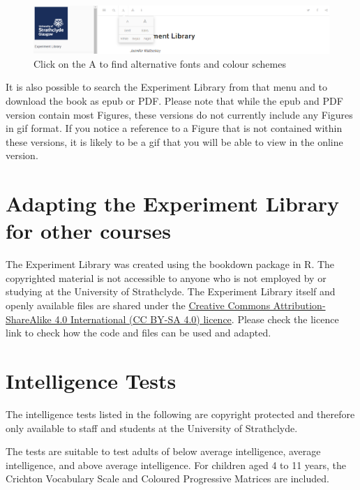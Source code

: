 \documentclass[
]{book}
\begin{document}
\begin{figure}

{\centering \includegraphics[width=0.95\linewidth]{images/accessibility} 

}

\caption{Click on the A to find alternative fonts and colour schemes}\label{fig:Figure0-1}
\end{figure}

It is also possible to search the Experiment Library from that menu and to download the book as epub or PDF. Please note that while the epub and PDF version contain most Figures, these versions do not currently include any Figures in gif format. If you notice a reference to a Figure that is not contained within these versions, it is likely to be a gif that you will be able to view in the online version.

\hypertarget{adapting-the-experiment-library-for-other-courses}{%
\chapter{Adapting the Experiment Library for other courses}\label{adapting-the-experiment-library-for-other-courses}}

The Experiment Library was created using the bookdown package in R. The copyrighted material is not accessible to anyone who is not employed by or studying at the University of Strathclyde. The Experiment Library itself and openly available files are shared under the \href{https://creativecommons.org/licenses/by-sa/4.0/}{Creative Commons Attribution-ShareAlike 4.0 International (CC BY-SA 4.0) licence}. Please check the licence link to check how the code and files can be used and adapted.

\hypertarget{intelligence-tests}{%
\chapter{Intelligence Tests}\label{intelligence-tests}}

The intelligence tests listed in the following are copyright protected and therefore only available to staff and students at the University of Strathclyde.

The tests are suitable to test adults of below average intelligence, average intelligence, and above average intelligence. For children aged 4 to 11 years, the Crichton Vocabulary Scale and Coloured Progressive Matrices are included.
\end{document}

